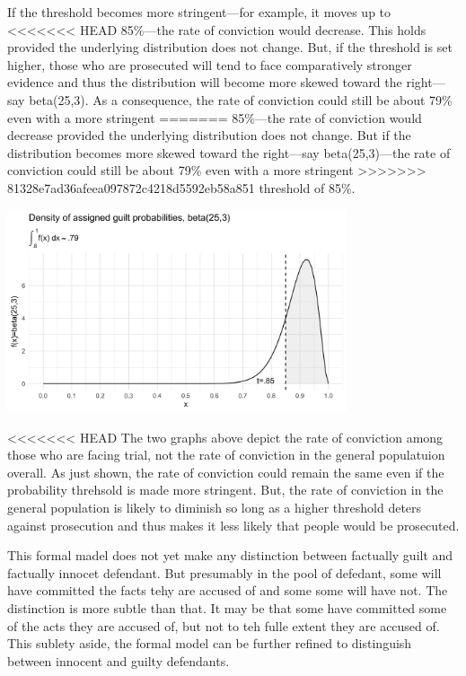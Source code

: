 \documentclass[10pt,dvipsnames,enabledeprecatedfontcommands]{scrartcl}
\begin{document}
If the threshold becomes more stringent---for example, it moves up to
<<<<<<< HEAD
85\%---the rate of conviction would decrease. This holds provided the
underlying distribution does not change. But, if the threshold is set
higher, those who are prosecuted will tend to face comparatively
stronger evidence and thus the distribution will become more skewed
toward the right---say \textsf{beta(25,3)}. As a consequence, the rate
of conviction could still be about 79\% even with a more stringent
=======
85\%---the rate of conviction would decrease provided the underlying
distribution does not change. But if the distribution becomes more
skewed toward the right---say \textsf{beta(25,3)}---the rate of
conviction could still be about 79\% even with a more stringent
>>>>>>> 81328e7ad36afeea097872c4218d5592eb58a851
threshold of 85\%.

\begin{center}
    \includegraphics[width=10cm]{dbeta(25,3)2.png}
\end{center}

<<<<<<< HEAD
The two graphs above depict the rate of conviction among those who are
facing trial, not the rate of conviction in the general populatuion
overall. As just shown, the rate of conviction could remain the same
even if the probability threhsold is made more stringent. But, the rate
of conviction in the general population is likely to diminish so long as
a higher threshold deters against prosecution and thus makes it less
likely that people would be prosecuted.

This formal madel does not yet make any distinction between factually
guilt and factually innocet defendant. But presumably in the pool of
defedant, some will have committed the facts tehy are accused of and
some some will have not. The distinction is more subtle than that. It
may be that some have committed some of the acts they are accused of,
but not to teh fulle extent they are accused of. This sublety aside, the
formal model can be further refined to distinguish between innocent and
guilty defendants.
\end{document}
